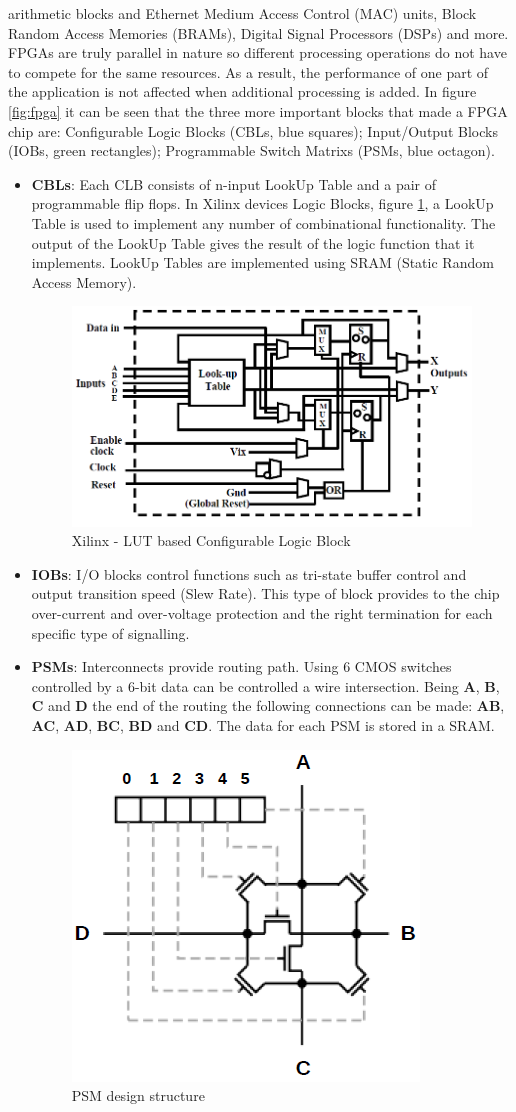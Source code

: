 arithmetic blocks and Ethernet Medium Access Control (MAC) units, Block Random Access Memories (BRAMs), Digital Signal Processors (DSPs) and more.
\\
FPGAs are truly parallel in nature so different processing operations do not have to compete for the same resources. As a result, the performance of one part of the application is not affected when additional processing is added.
\newline
\noindent In figure \ref{fig:fpga} it can be seen that the three more important blocks that made a FPGA chip are: Configurable Logic Blocks (CBLs, blue squares); Input/Output Blocks (IOBs, green rectangles); Programmable Switch Matrixs (PSMs, blue octagon).
\begin{itemize}
	\item \textbf{CBLs}: Each CLB consists of n-input LookUp Table and a pair of programmable flip flops. In Xilinx devices Logic Blocks, figure \ref{fig:clb}, a LookUp Table is used to implement any number of combinational functionality. The output of the LookUp Table gives the result of the logic function that it implements. LookUp Tables are implemented using SRAM (Static Random Access Memory).
	\begin{figure}[H]
		\centering
		\includegraphics[width=0.7\linewidth]{IMG/ch3/CLB}
		\caption{Xilinx - LUT based Configurable Logic Block}
		\label{fig:clb}
	\end{figure}
	\item \textbf{IOBs}: I/O blocks control functions such as tri-state buffer control and output transition speed (Slew Rate).
	This type of block provides to the chip over-current and over-voltage protection and the right termination for each specific type of signalling.
	\item \textbf{PSMs}: Interconnects provide routing path. Using 6 CMOS switches controlled by a 6-bit data can be controlled a  wire intersection. Being \textbf{A}, \textbf{B}, \textbf{C} and \textbf{D} the  end of the routing the following connections can be made: \textbf{AB}, \textbf{AC}, \textbf{AD}, \textbf{BC}, \textbf{BD} and \textbf{CD}.
	The data for each PSM is stored in a SRAM.
	\begin{figure}[H]
		\centering
		\includegraphics[width=0.25\linewidth]{IMG/ch3/PSM}
		\caption{PSM design structure}
		\label{fig:psm}
	\end{figure}
\end{itemize}
